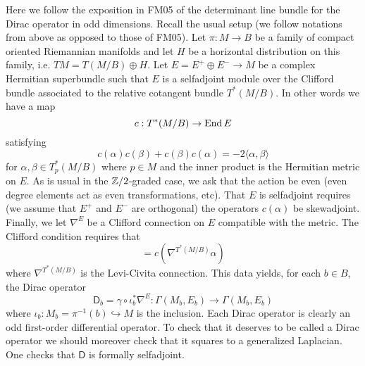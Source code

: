 \documentclass{amsart}
\renewcommand\d{\mathsf{D}}
\begin{document}
Here we follow the exposition in FM05 of the determinant line bundle for the
Dirac operator in odd dimensions. Recall the usual setup (we follow notations from
above as opposed to those of FM05). Let $\pi:M\to B$ be a family
of compact oriented Riemannian manifolds and let $H$ be a horizontal distribution
on this family, i.e. $TM=T(M/B)\oplus H$. Let $E=E^+\oplus E^-\to M$ be a complex Hermitian
superbundle such that $E$ is a selfadjoint module over the Clifford bundle associated to the
relative cotangent bundle $T^*(M/B)$. In other words we have a map
\begin{equation*}
    c: T^*(M/B) \to \operatorname{End} E
\end{equation*}
satisfying
\begin{equation*}
    c(\alpha)c(\beta) + c(\beta)c(\alpha) = - 2 \langle\alpha,\beta\rangle
\end{equation*}
for $\alpha,\beta\in T^*_p(M/B)$ where $p\in M$ and the inner product is the
Hermitian metric on $E$. As is usual in the $\mathbb{Z}/2$-graded case, we ask that
the action be even (even degree elements act as even transformations, etc).
That $E$ is selfadjoint requires (we assume that $E^+$ and $E^-$ are orthogonal)
the operators $c(\alpha)$ be skewadjoint.
Finally, we let $\nabla^E$ be a Clifford connection on $E$ compatible with the metric.
The Clifford condition requires that
\begin{equation*}
    [\nabla_X^E, c(\alpha)] = c(\nabla^{T^*(M/B)}\alpha)
\end{equation*}
where $\nabla^{T^*(M/B)}$ is the Levi-Civita connection.
This data yields, for each $b\in B$, the Dirac operator
\begin{equation*}
    \d_b = \gamma \circ \iota_b^*\nabla^E : \Gamma(M_b, E_b) \to \Gamma(M_b, E_b)
\end{equation*}
where $\iota_b: M_b=\pi^{-1}(b)\hookrightarrow M$ is the inclusion. Each Dirac
operator is clearly an odd first-order differential operator. To check that it deserves
to be called a Dirac operator we should moreover check that it squares to a generalized
Laplacian.
One checks that $\d$ is formally selfadjoint.
\end{document}
